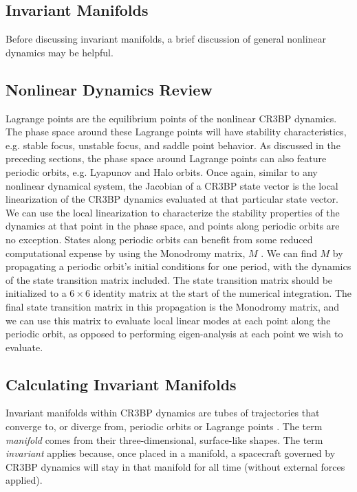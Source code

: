 \documentclass[conf]{new-aiaa}
\begin{document}
\begin{multicols*}{2}
\section{Invariant Manifolds}

Before discussing invariant manifolds, a brief discussion of 
general nonlinear dynamics may be helpful. 

\subsection{Nonlinear Dynamics Review}
Lagrange points 
are the equilibrium points of the nonlinear CR3BP dynamics.
The phase space around these Lagrange points will have stability 
characteristics, e.g. stable focus, unstable focus, and
saddle point behavior. As discussed in the preceding sections, the phase
space around Lagrange points can also feature periodic orbits, e.g. 
Lyapunov and Halo orbits. Once again, similar to any nonlinear 
dynamical system, the Jacobian of a CR3BP state vector is the 
local linearization of the CR3BP dynamics evaluated at that particular 
state vector. We can use the local linearization to characterize the 
stability properties of the dynamics at that point in the phase space, 
and points along periodic orbits are no exception. States 
along periodic orbits can benefit from some reduced computational 
expense by using the Monodromy matrix, $M$ \cite{rund2018interplanetary}. 
We can find $M$ by 
propagating a periodic orbit's initial conditions for one period, 
with the dynamics of the state transition matrix included. The 
state transition matrix should be initialized to a $6 \times 6$ 
identity matrix at the start of the numerical integration. 
The final state transition matrix in this propagation is the 
Monodromy matrix, and we can use this matrix to 
evaluate local linear modes at each point along the periodic 
orbit, as opposed to performing eigen-analysis at each point 
we wish to evaluate. 

\subsection{Calculating Invariant Manifolds}
Invariant manifolds within CR3BP dynamics are tubes of trajectories
that converge to, or diverge from, periodic orbits or Lagrange points
\cite{rund2018interplanetary} \cite{topputo2005low}. The term 
\textit{manifold} comes from their three-dimensional, surface-like
shapes. The term \textit{invariant} applies because, once placed in 
a manifold, a spacecraft governed by CR3BP dynamics
will stay in that manifold for all time (without external forces applied).


\end{multicols*}
\end{document}
